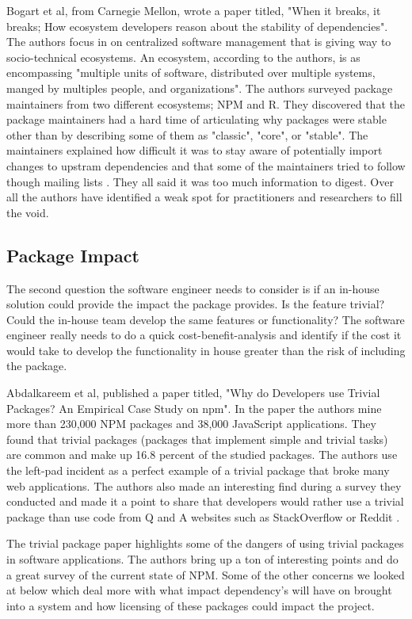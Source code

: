 \documentclass[journal]{IEEEtran}
\begin{document}
Bogart et al, from Carnegie Mellon, wrote a paper titled, "When it breaks, it breaks; How ecosystem developers reason about the stability of dependencies". The authors focus in on centralized software management that is giving way to socio-technical ecosystems. An ecosystem, according to the authors, is as encompassing "multiple units of software, distributed over multiple systems, manged by multiples people, and organizations". The authors surveyed package maintainers from two different ecosystems; NPM and R. They discovered that the package maintainers had a hard time of articulating why packages were stable other than by describing some of them as "classic", "core", or "stable". The maintainers explained how difficult it was to stay aware of potentially import changes to upstram dependencies and that some of the maintainers tried to follow though mailing lists \cite{bogart2015breaks}. They all said it was too much information to digest. Over all the authors have identified a weak spot for practitioners and researchers to fill the void. 

\subsection{Package Impact}
The second question the software engineer needs to consider is if an in-house solution could provide the impact the package provides. Is the feature trivial? Could the in-house team develop the same features or functionality? The software engineer really needs to do a quick cost-benefit-analysis and identify if the cost it would take to develop the functionality in house greater than the risk of including the package.

Abdalkareem et al, published a paper titled, "Why do Developers use Trivial Packages? An Empirical Case Study on npm". In the paper the authors mine more than 230,000 NPM packages and 38,000 JavaScript applications. They found that trivial packages (packages that implement simple and trivial tasks) are common and make up 16.8 percent of the studied packages. The authors use the left-pad incident as a perfect example of a trivial package that broke many web applications. The authors also made an interesting find during a survey they conducted and made it a point to share that developers would rather use a trivial package than use code from Q and A websites such as StackOverflow or Reddit \cite{Abdalkareem_Nourry_Wehaibi_Mujahid_Shihab_2017}. 

The trivial package paper highlights some of the dangers of using trivial packages in software applications. The authors bring up a ton of interesting points and do a great survey of the current state of NPM. Some of the other concerns we looked at below which deal more with what impact dependency's will have on brought into a system and how licensing of these packages could impact the project. 
\end{document}
